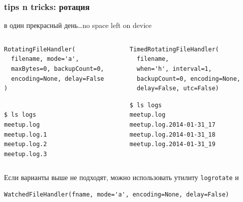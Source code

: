 \documentclass[aspectratio=169]{beamer}
\begin{document}
\begin{frame}[fragile]
  \frametitle{tips n tricks: ротация}

  в один прекрасный день\ldots \pause no space left on device  


  \begin{columns}

    \begin{column}{.5\textwidth}
      \begin{lstlisting}
RotatingFileHandler(
  filename, mode='a',
  maxBytes=0, backupCount=0,
  encoding=None, delay=False
)
 
      \end{lstlisting}

      \begin{lstlisting}[language=sh]
$ ls logs
meetup.log
meetup.log.1
meetup.log.2
meetup.log.3
      \end{lstlisting}
    \end{column}

    \pause
    
    \begin{column}{.5\textwidth}
      \begin{lstlisting}
TimedRotatingFileHandler(
  filename,
  when='h', interval=1,
  backupCount=0, encoding=None,
  delay=False, utc=False)
      \end{lstlisting}

      \begin{lstlisting}[language=sh]
$ ls logs
meetup.log
meetup.log.2014-01-31_17
meetup.log.2014-01-31_18
meetup.log.2014-01-31_19
      \end{lstlisting}
    \end{column}

  \end{columns}

  \pause

Если варианты выше не подходят, можно использовать утилиту {\tt logrotate} и
  \begin{lstlisting}
WatchedFileHandler(fname, mode='a', encoding=None, delay=False)
  \end{lstlisting}
  
\end{frame}
\end{document}
